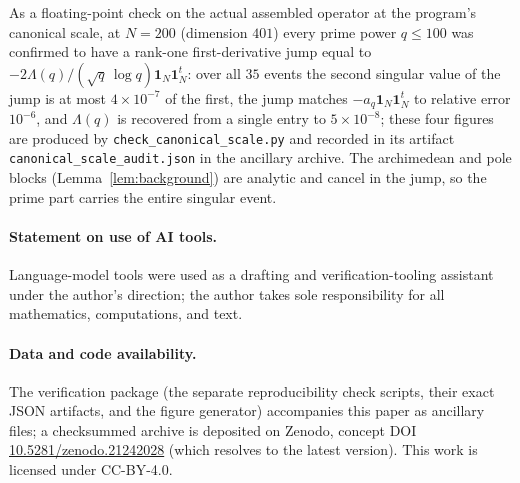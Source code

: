 \documentclass[11pt]{article}
\theoremstyle{plain}
\theoremstyle{definition}
\theoremstyle{remark}
\newcommand{\one}{\mathbf 1}
\newcommand{\Lam}{\Lambda}
\begin{document}
As a floating-point check on the actual assembled operator at the program's
canonical scale, at $N=200$ (dimension $401$) every prime power $q\le100$ was
confirmed to have a rank-one first-derivative jump equal to
$-2\Lam(q)/(\sqrt q\,\log q)\one_N\one_N^t$: over all $35$ events the second
singular value of the jump is at most $4\times10^{-7}$ of the first, the jump
matches $-a_q\one_N\one_N^t$ to relative error $10^{-6}$, and $\Lam(q)$ is
recovered from a single entry to $5\times10^{-8}$; these four figures are
produced by \texttt{check\_canonical\_scale.py} and recorded in its artifact
\texttt{canonical\_scale\_audit.json} in the ancillary archive. The archimedean and pole
blocks (Lemma~\ref{lem:background}) are analytic and cancel in the jump, so the
prime part carries the entire singular event.

\paragraph{Statement on use of AI tools.}
Language-model tools were used as a drafting and verification-tooling assistant
under the author's direction; the author takes sole responsibility for all
mathematics, computations, and text.

\paragraph{Data and code availability.}
The verification package (the separate reproducibility check scripts, their exact JSON
artifacts, and the figure generator) accompanies this paper as ancillary files;
a checksummed archive is deposited on Zenodo, concept DOI
\href{https://doi.org/10.5281/zenodo.21242028}{10.5281/zenodo.21242028} (which
resolves to the latest version). This work is licensed under CC-BY-4.0.

{\footnotesize\raggedright


}
\end{document}
